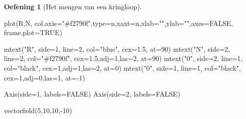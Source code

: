 \documentclass[
  a4paper,
]{scrbook}
\newenvironment{Shaded}{\begin{snugshade}}{\end{snugshade}}
\newcommand{\AttributeTok}[1]{\textcolor[rgb]{0.40,0.45,0.13}{#1}}
\newcommand{\ConstantTok}[1]{\textcolor[rgb]{0.56,0.35,0.01}{#1}}
\newcommand{\DecValTok}[1]{\textcolor[rgb]{0.68,0.00,0.00}{#1}}
\newcommand{\FloatTok}[1]{\textcolor[rgb]{0.68,0.00,0.00}{#1}}
\newcommand{\FunctionTok}[1]{\textcolor[rgb]{0.28,0.35,0.67}{#1}}
\newcommand{\NormalTok}[1]{\textcolor[rgb]{0.00,0.23,0.31}{#1}}
\newcommand{\SpecialCharTok}[1]{\textcolor[rgb]{0.37,0.37,0.37}{#1}}
\newcommand{\StringTok}[1]{\textcolor[rgb]{0.13,0.47,0.30}{#1}}
\theoremstyle{definition}
\newtheorem{exercise}{Oefening}[chapter]
\theoremstyle{remark}
\begin{document}
\begin{exercise}[Het mengen van een
kringloop]
\begin{Shaded}
\begin{Highlighting}[]
\FunctionTok{plot}\NormalTok{(R,N,  }\AttributeTok{col.axis=}\StringTok{"\#f2790f"}\NormalTok{,}\AttributeTok{type=}\StringTok{\textquotesingle{}n\textquotesingle{}}\NormalTok{,}\AttributeTok{xaxt=}\StringTok{\textquotesingle{}n\textquotesingle{}}\NormalTok{,}\AttributeTok{xlab=}\StringTok{""}\NormalTok{,}\AttributeTok{ylab=}\StringTok{""}\NormalTok{,}\AttributeTok{axes=}\ConstantTok{FALSE}\NormalTok{, }\AttributeTok{frame.plot=}\ConstantTok{TRUE}\NormalTok{)}

\FunctionTok{mtext}\NormalTok{(}\StringTok{"R"}\NormalTok{, }\AttributeTok{side=}\DecValTok{1}\NormalTok{, }\AttributeTok{line=}\DecValTok{2}\NormalTok{, }\AttributeTok{col=}\StringTok{"blue"}\NormalTok{, }\AttributeTok{cex=}\FloatTok{1.5}\NormalTok{, }\AttributeTok{at=}\DecValTok{90}\NormalTok{)}
\FunctionTok{mtext}\NormalTok{(}\StringTok{"N"}\NormalTok{, }\AttributeTok{side=}\DecValTok{2}\NormalTok{, }\AttributeTok{line=}\DecValTok{2}\NormalTok{, }\AttributeTok{col=}\StringTok{"\#f2790f"}\NormalTok{, }\AttributeTok{cex=}\FloatTok{1.5}\NormalTok{,}\AttributeTok{adj=}\DecValTok{1}\NormalTok{,}\AttributeTok{las=}\DecValTok{2}\NormalTok{, }\AttributeTok{at=}\DecValTok{90}\NormalTok{)}
\FunctionTok{mtext}\NormalTok{(}\StringTok{"0"}\NormalTok{, }\AttributeTok{side=}\DecValTok{2}\NormalTok{, }\AttributeTok{line=}\DecValTok{1}\NormalTok{, }\AttributeTok{col=}\StringTok{"black"}\NormalTok{, }\AttributeTok{cex=}\DecValTok{1}\NormalTok{,}\AttributeTok{adj=}\DecValTok{1}\NormalTok{,}\AttributeTok{las=}\DecValTok{2}\NormalTok{, }\AttributeTok{at=}\DecValTok{0}\NormalTok{)}
\FunctionTok{mtext}\NormalTok{(}\StringTok{"0"}\NormalTok{, }\AttributeTok{side=}\DecValTok{1}\NormalTok{, }\AttributeTok{line=}\DecValTok{1}\NormalTok{, }\AttributeTok{col=}\StringTok{"black"}\NormalTok{, }\AttributeTok{cex=}\DecValTok{1}\NormalTok{,}\AttributeTok{adj=}\DecValTok{0}\NormalTok{,}\AttributeTok{las=}\DecValTok{1}\NormalTok{, }\AttributeTok{at=}\SpecialCharTok{{-}}\DecValTok{1}\NormalTok{)}

\FunctionTok{Axis}\NormalTok{(}\AttributeTok{side=}\DecValTok{1}\NormalTok{, }\AttributeTok{labels=}\ConstantTok{FALSE}\NormalTok{)}
\FunctionTok{Axis}\NormalTok{(}\AttributeTok{side=}\DecValTok{2}\NormalTok{, }\AttributeTok{labels=}\ConstantTok{FALSE}\NormalTok{)}

\FunctionTok{vectorfield}\NormalTok{(}\DecValTok{5}\NormalTok{,}\DecValTok{10}\NormalTok{,}\DecValTok{10}\NormalTok{,}\SpecialCharTok{{-}}\DecValTok{10}\NormalTok{)}
\end{Highlighting}
\end{Shaded}


\end{exercise}
\end{document}
